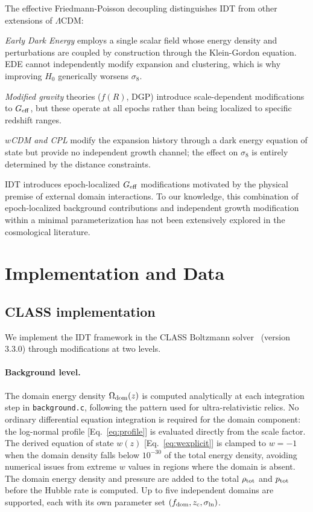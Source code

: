 \documentclass[aps,prd,twocolumn,superscriptaddress,nofootinbib]{revtex4-2}
\newcommand{\Odom}{\Omega_{\rm dom}}
\newcommand{\fdom}{f_{\rm dom}}
\newcommand{\zc}{z_{\rm c}}
\newcommand{\sln}{\sigma_{\ln}}
\newcommand{\Geff}{G_{\rm eff}}
\begin{document}
The effective Friedmann-Poisson decoupling distinguishes IDT from
other extensions of $\Lambda$CDM:

\emph{Early Dark Energy} employs a single scalar field whose energy 
density and perturbations are coupled by construction through the 
Klein-Gordon equation. EDE cannot independently modify expansion and 
clustering, which is why improving $H_0$ generically worsens $\sigma_8$.

\emph{Modified gravity} theories ($f(R)$, DGP) introduce 
scale-dependent modifications to $\Geff$, but these operate at all 
epochs rather than being localized to specific redshift ranges.

\emph{$w$CDM and CPL} modify the expansion history through a dark 
energy equation of state but provide no independent growth channel; 
the effect on $\sigma_8$ is entirely determined by the distance 
constraints.

IDT introduces epoch-localized $\Geff$ modifications motivated by the
physical premise of external domain interactions. To our knowledge,
this combination of epoch-localized background contributions and
independent growth modification within a minimal parameterization
has not been extensively explored in the cosmological literature.

\section{Implementation and Data}
\label{sec:implementation}

\subsection{CLASS implementation}

We implement the IDT framework in the CLASS Boltzmann
solver~\cite{CLASS2011} (version 3.3.0) through modifications at two
levels.

\paragraph{Background level.}
The domain energy density $\Odom(z)$ is computed analytically at each
integration step in \texttt{background.c}, following the pattern used
for ultra-relativistic relics. No ordinary differential equation
integration is required for the domain component: the log-normal profile
[Eq.~\eqref{eq:profile}] is evaluated directly from the scale factor.
The derived equation of state $w(z)$ [Eq.~\eqref{eq:wexplicit}] is
clamped to $w = -1$ when the domain density falls below $10^{-30}$ of
the total energy density, avoiding numerical issues from extreme $w$
values in regions where the domain is absent. The domain energy density
and pressure are added to the total $\rho_{\rm tot}$ and $p_{\rm tot}$
before the Hubble rate is computed. Up to five independent domains are
supported, each with its own parameter set $(\fdom, \zc, \sln)$.
\end{document}
